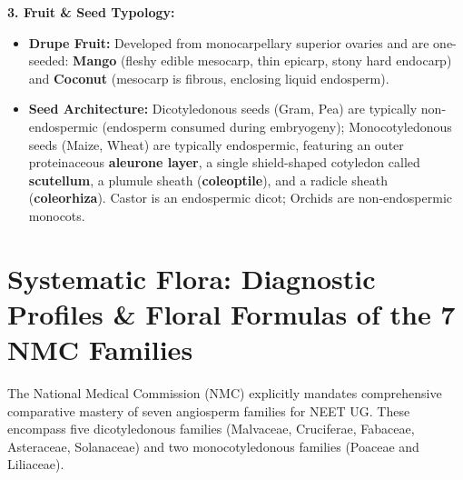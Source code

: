 \documentclass[10pt,twoside,openright]{book}
\begin{document}
\begin{conceptbox}
\textbf{3. Fruit \& Seed Typology:}
\begin{itemize}
  \item \textbf{Drupe Fruit:} Developed from monocarpellary superior ovaries and are one-seeded: \textbf{Mango} (fleshy edible mesocarp, thin epicarp, stony hard endocarp) and \textbf{Coconut} (mesocarp is fibrous, enclosing liquid endosperm).
  \item \textbf{Seed Architecture:} Dicotyledonous seeds (Gram, Pea) are typically non-endospermic (endosperm consumed during embryogeny); Monocotyledonous seeds (Maize, Wheat) are typically endospermic, featuring an outer proteinaceous \textbf{aleurone layer}, a single shield-shaped cotyledon called \textbf{scutellum}, a plumule sheath (\textbf{coleoptile}), and a radicle sheath (\textbf{coleorhiza}). Castor is an endospermic dicot; Orchids are non-endospermic monocots.
\end{itemize}
\end{conceptbox}

\section{Systematic Flora: Diagnostic Profiles \& Floral Formulas of the 7 NMC Families}

The National Medical Commission (NMC) explicitly mandates comprehensive comparative mastery of seven angiosperm families for NEET UG. These encompass five dicotyledonous families (Malvaceae, Cruciferae, Fabaceae, Asteraceae, Solanaceae) and two monocotyledonous families (Poaceae and Liliaceae).
\end{document}
